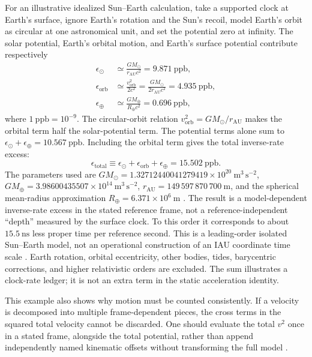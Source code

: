 \documentclass[12pt]{article}
\begin{document}
For an illustrative idealized Sun--Earth calculation, take a supported clock at Earth's surface, ignore Earth's rotation and the Sun's recoil, model Earth's orbit as circular at one astronomical unit, and set the potential zero at infinity. The solar potential, Earth's orbital motion, and Earth's surface potential contribute respectively
\begin{align}
  \epsilon_{\odot}
  &\simeq\frac{GM_{\odot}}{r_{\mathrm{AU}}c^2}
    =9.871\ \mathrm{ppb},\\
  \epsilon_{\mathrm{orb}}
  &\simeq\frac{v_{\mathrm{orb}}^2}{2c^2}
    =\frac{GM_{\odot}}{2r_{\mathrm{AU}}c^2}
    =4.935\ \mathrm{ppb},\\
  \epsilon_{\oplus}
  &\simeq\frac{GM_{\oplus}}{R_{\oplus}c^2}
    =0.696\ \mathrm{ppb},
  \label{eq:ledger-terms}
\end{align}
where $1\ \mathrm{ppb}=10^{-9}$. The circular-orbit relation $v_{\mathrm{orb}}^2=GM_{\odot}/r_{\mathrm{AU}}$ makes the orbital term half the solar-potential term. The potential terms alone sum to $\epsilon_{\odot}+\epsilon_{\oplus}=10.567\ \mathrm{ppb}$. Including the orbital term gives the total inverse-rate excess:
\begin{equation}
  \epsilon_{\mathrm{total}}\equiv\epsilon_{\odot}+\epsilon_{\mathrm{orb}}+\epsilon_{\oplus}
  =15.502\ \mathrm{ppb}.
  \label{eq:ledger-total}
\end{equation}
The parameters used are $GM_{\odot}=1.32712440041279419\times10^{20}\ \mathrm{m^3\,s^{-2}}$, $GM_{\oplus}=3.98600435507\times10^{14}\ \mathrm{m^3\,s^{-2}}$, $r_{\mathrm{AU}}=149\,597\,870\,700\ \mathrm{m}$, and the spherical mean-radius approximation $R_{\oplus}=6.371\times10^6\ \mathrm{m}$ \cite{Park,JPL}. The result is a model-dependent inverse-rate excess in the stated reference frame, not a reference-independent ``depth'' measured by the surface clock. To this order it corresponds to about $15.5\ \mathrm{ns}$ less proper time per reference second. This is a leading-order isolated Sun--Earth model, not an operational construction of an IAU coordinate time scale \cite{IERS}. Earth rotation, orbital eccentricity, other bodies, tides, barycentric corrections, and higher relativistic orders are excluded. The sum illustrates a clock-rate ledger; it is not an extra term in the static acceleration identity.

This example also shows why motion must be counted consistently. If a velocity is decomposed into multiple frame-dependent pieces, the cross terms in the squared total velocity cannot be discarded. One should evaluate the total $v^2$ once in a stated frame, alongside the total potential, rather than append independently named kinematic offsets without transforming the full model \cite{IERS}.
\end{document}
